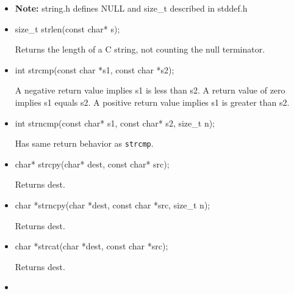 \documentclass{report}
\begin{document}
    \pagebreak 
    \begin{itemize}
        \item \textbf{Note:} string.h defines NULL and size\_t described in stddef.h
        \item 
            \bigbreak \noindent 
            \begin{cppcode}
                size_t strlen(const char* s);
            \end{cppcode}
            \bigbreak \noindent 
            Returns the length of a C string, not counting the null terminator.
        \item 
            \bigbreak \noindent 
            \begin{cppcode}
                int strcmp(const char *s1, const char *s2);
            \end{cppcode}
            \bigbreak \noindent 
            A negative return value implies s1 is less than s2. A return value of zero implies s1 equals s2. A positive return value implies s1 is greater than s2.
        \item
            \bigbreak \noindent 
            \begin{cppcode}
            int strncmp(const char* s1, const char* s2, size_t n);
            \end{cppcode}
            \bigbreak \noindent 
            Has same return behavior as \texttt{strcmp}.
        \item 
            \bigbreak \noindent 
            \begin{cppcode}
                char* strcpy(char* dest, const char* src);
            \end{cppcode}
            \bigbreak \noindent 
            Returns dest.
        \item
            \bigbreak \noindent 
            \begin{cppcode}
                char *strncpy(char *dest, const char *src, size_t n);
            \end{cppcode}
            \bigbreak \noindent 
            Returns dest.
        \item
            \bigbreak \noindent 
            \begin{cppcode}
            char *strcat(char *dest, const char *src);
            \end{cppcode}
            \bigbreak \noindent 
            Returns dest.
        \item
            \bigbreak \noindent 
            \begin{cppcode}

\end{cppcode}
\end{itemize}
\end{document}
